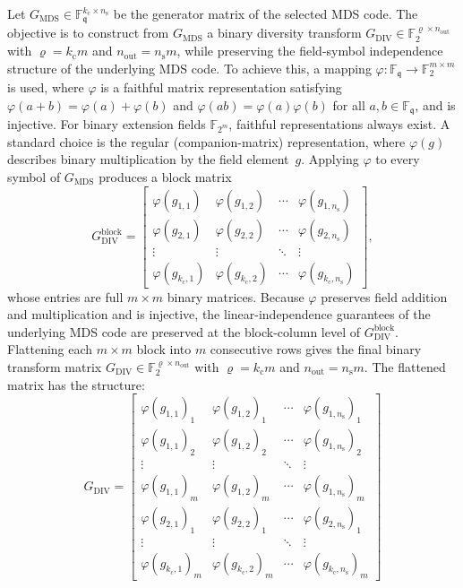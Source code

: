 \documentclass[journal]{IEEEtran}
\begin{document}
Let $G_{\mathrm{MDS}} \in 
\mathbb{F}_{\mathfrak{q}}^{k_{\mathrm{c}} \times n_{\mathrm{s}}}$ 
be the generator matrix of the selected MDS code. The objective is 
to construct from $G_{\mathrm{MDS}}$ a binary diversity transform 
$G_{\mathrm{DIV}} \in \mathbb{F}_{2}^{\varrho \times n_{\text{out}}}$ 
with $\varrho = k_{\mathrm{c}} m$ and $n_{\text{out}} = n_{\mathrm{s}} m$, 
while preserving the field-symbol independence structure of the 
underlying MDS code. To achieve this, a mapping $\varphi : \mathbb{F}_{\mathfrak{q}} 
\rightarrow \mathbb{F}_{2}^{m \times m}$ is used, where $\varphi$ 
is a faithful matrix representation satisfying 
$\varphi(a+b)=\varphi(a)+\varphi(b)$ and 
$\varphi(ab)=\varphi(a)\varphi(b)$ for all 
$a,b\in\mathbb{F}_{\mathfrak{q}}$, and is injective. For 
binary extension fields $\mathbb{F}_{2^{m}}$, faithful 
representations always exist. A standard choice is the regular 
(companion-matrix) representation, where $\varphi(g)$ describes 
binary multiplication by the field element~$g$. Applying $\varphi$ to every symbol of $G_{\mathrm{MDS}}$ produces 
a block matrix
\[
G_{\mathrm{DIV}}^{\mathrm{block}}
=
\begin{bmatrix}
\varphi(g_{1,1}) & \varphi(g_{1,2}) & \cdots & 
\varphi(g_{1,n_{\mathrm{s}}}) \\
\varphi(g_{2,1}) & \varphi(g_{2,2}) & \cdots & 
\varphi(g_{2,n_{\mathrm{s}}}) \\
\vdots & \vdots & \ddots & \vdots \\
\varphi(g_{k_{\mathrm{c}},1}) & \varphi(g_{k_{\mathrm{c}},2}) & 
\cdots & \varphi(g_{k_{\mathrm{c}},n_{\mathrm{s}}})
\end{bmatrix},
\]
whose entries are full $m \times m$ binary matrices. Because 
$\varphi$ preserves field addition and multiplication and is 
injective, the linear-independence guarantees of the underlying MDS 
code are preserved at the block-column level of 
$G_{\mathrm{DIV}}^{\mathrm{block}}$. Flattening each $m \times m$ block into $m$ consecutive rows gives 
the final binary transform matrix 
$G_{\mathrm{DIV}} \in \mathbb{F}_{2}^{\varrho \times n_{\text{out}}}$ 
with $\varrho = k_{\mathrm{c}} m$ and $n_{\text{out}} = n_{\mathrm{s}} m$.
The flattened matrix has the structure:
\[
G_{\mathrm{DIV}} = 
\begin{bmatrix}
\varphi(g_{1,1})_1 & \varphi(g_{1,2})_1 & \cdots & 
\varphi(g_{1,n_{\mathrm{s}}})_1 \\
\varphi(g_{1,1})_2 & \varphi(g_{1,2})_2 & \cdots & 
\varphi(g_{1,n_{\mathrm{s}}})_2 \\
\vdots & \vdots & \ddots & \vdots \\
\varphi(g_{1,1})_m & \varphi(g_{1,2})_m & \cdots & 
\varphi(g_{1,n_{\mathrm{s}}})_m \\
\varphi(g_{2,1})_1 & \varphi(g_{2,2})_1 & \cdots & 
\varphi(g_{2,n_{\mathrm{s}}})_1 \\
\vdots & \vdots & \ddots & \vdots \\
\varphi(g_{k_{\mathrm{c}},1})_m & \varphi(g_{k_{\mathrm{c}},2})_m 
& \cdots & \varphi(g_{k_{\mathrm{c}},n_{\mathrm{s}}})_m
\end{bmatrix}
\]
\end{document}
